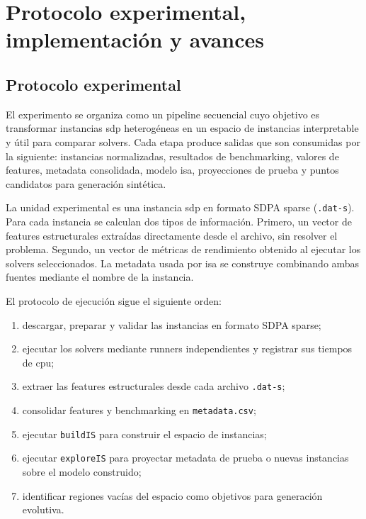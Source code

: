 \chapter{Protocolo experimental, implementación y avances}
\label{ch:protocolo}
\label{ch:Avances}

\section{Protocolo experimental}
\label{sec:avance_protocolo}

El experimento se organiza como un pipeline secuencial cuyo objetivo es transformar
instancias \acrshort{sdp} heterogéneas en un espacio de instancias interpretable y
útil para comparar solvers.
Cada etapa produce salidas que son consumidas por la siguiente: instancias
normalizadas, resultados de benchmarking, valores de features, metadata consolidada,
modelo \acrshort{isa}, proyecciones de prueba y puntos candidatos para generación
sintética.

La unidad experimental es una instancia \acrshort{sdp} en formato SDPA sparse
(\texttt{.dat-s}).
Para cada instancia se calculan dos tipos de información.
Primero, un vector de features estructurales extraídas directamente desde el archivo,
sin resolver el problema.
Segundo, un vector de métricas de rendimiento obtenido al ejecutar los solvers
seleccionados.
La metadata usada por \acrshort{isa} se construye combinando ambas fuentes mediante el
nombre de la instancia.

El protocolo de ejecución sigue el siguiente orden:
\begin{enumerate}
    \item descargar, preparar y validar las instancias en formato SDPA sparse;
    \item ejecutar los solvers mediante runners independientes y registrar sus tiempos
    de \acrshort{cpu};
    \item extraer las features estructurales desde cada archivo \texttt{.dat-s};
    \item consolidar features y benchmarking en \texttt{metadata.csv};
    \item ejecutar \texttt{buildIS} para construir el espacio de instancias;
    \item ejecutar \texttt{exploreIS} para proyectar metadata de prueba o nuevas
    instancias sobre el modelo construido;
    \item identificar regiones vacías del espacio como objetivos para generación
    evolutiva.
\end{enumerate}

